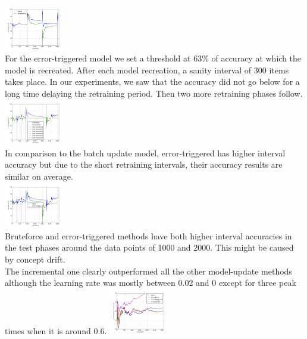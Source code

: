    \includegraphics[width=0.2\textwidth]{./plots/bruteforce_batch}\\
For the error-triggered model we set a threshold at 63\% of accuracy at which the model is recreated. After each model recreation, a sanity interval of 300 items takes place. In our experiments, we saw that the accuracy did not go below for a long time delaying the retraining period. Then two more retraining phases follow.\\
   \includegraphics[width=0.2\textwidth]{./plots/errorTriggeredPlot}\\
In comparison to the batch update model, error-triggered has higher interval accuracy but due to the short retraining intervals, their accuracy results are similar on average. \\
\includegraphics[width=0.2\textwidth]{./plots/errortriggered_batch}\\
Bruteforce and error-triggered methods have both higher interval accuracies in the test phases around the data points of 1000 and 2000. This might be caused by concept drift. 
\\
The incremental one clearly outperformed all the other model-update methods although the learning rate was mostly between 0.02 and 0 except for three peak times when it is around 0.6.
   \includegraphics[width=0.2\textwidth]{./plots/allAccuracies}\\

